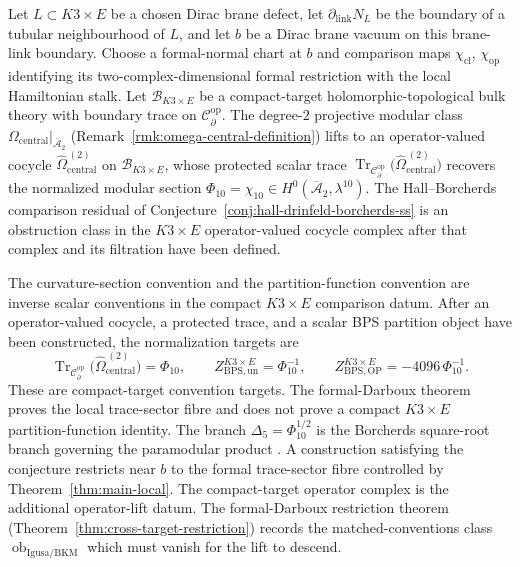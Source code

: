 \documentclass[11pt]{memoir}
\begin{document}
\begin{conj}\label{conj:operator-modular-lift}
  Let \(L\subset K3\times E\) be a chosen Dirac brane defect, let
  \(\partial_{\mathrm{link}}N_L\) be the boundary of a tubular
  neighbourhood of \(L\), and let \(b\) be a Dirac brane vacuum on this
  brane-link boundary.  Choose a formal-normal chart at \(b\) and
  comparison maps \(\chi_{\mathrm{cl}}\), \(\chi_{\mathrm{op}}\)
  identifying its two-complex-dimensional formal restriction with the
  local Hamiltonian stalk.  Let \(\mathcal B_{K3\times E}\) be a
  compact-target holomorphic-topological bulk theory with boundary
  trace on \(\mathcal C^{\mathrm{op}}_\partial\).  The degree-\(2\)
  projective modular class
  \(\Omega_{\mathrm{central}}\bigl|_{\overline{\mathcal A}_2}\)
  (Remark~\ref{rmk:omega-central-definition}) lifts to an
  operator-valued cocycle
  \(\widehat\Omega_{\mathrm{central}}^{\,(2)}\) on
  \(\mathcal B_{K3\times E}\),
  whose protected scalar trace
  \(\operatorname{Tr}_{\mathcal C^{\mathrm{op}}_\partial}\bigl(\widehat\Omega_{\mathrm{central}}^{\,(2)}\bigr)\)
  recovers the normalized modular section
  \(\Phi_{10}=\chi_{10}\in H^0(\overline{\mathcal A}_2,\lambda^{10})\).
	  The Hall--Borcherds comparison residual of
	  Conjecture~\ref{conj:hall-drinfeld-borcherds-ss} is an obstruction
	  class in the \(K3\times E\) operator-valued cocycle complex after that
	  complex and its filtration have been defined.
\end{conj}
The curvature-section convention and the partition-function convention
are inverse scalar conventions in the compact \(K3\times E\) comparison
datum.  After an operator-valued cocycle, a protected trace, and a
scalar BPS partition object have been constructed, the normalization
targets are
\[
  \operatorname{Tr}_{\mathcal C^{\mathrm{op}}_\partial}
    \bigl(\widehat\Omega_{\mathrm{central}}^{\,(2)}\bigr)
  =\Phi_{10},\qquad
  Z^{K3\times E}_{\mathrm{BPS,un}}
  =\Phi_{10}^{-1},\qquad
  Z^{K3\times E}_{\mathrm{BPS,OP}}
  =-4096\,\Phi_{10}^{-1}.
\]
These are compact-target convention targets.  The formal-Darboux
theorem proves the local trace-sector fibre and does not prove a
compact \(K3\times E\) partition-function identity.
The branch \(\Delta_5=\Phi_{10}^{1/2}\) is the Borcherds
square-root branch governing the paramodular product
\cite{gritsenko-nikulin-paramodular}.  A construction satisfying the
conjecture restricts near \(b\) to the formal trace-sector fibre
controlled by Theorem~\ref{thm:main-local}.  The compact-target
operator complex is the additional operator-lift datum.  The
formal-Darboux restriction theorem
(Theorem~\ref{thm:cross-target-restriction})
records the matched-conventions class
\(\operatorname{ob}_{\mathrm{Igusa/BKM}}\) which must vanish for the
lift to descend.
\end{document}
